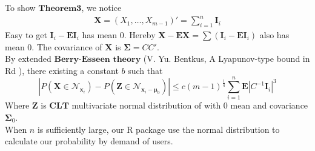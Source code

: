 \documentclass[12pt]{article}
\newcommand{\EE}{\mathbf{E}}
\begin{document}
To show $\mathbf{Theorem 3}$, we notice
\begin{align*}
    \boldsymbol{X} = (X_1,\dots,X_{m-1})' = \sum_{i=1}^{n} \boldsymbol{I}_{i} 
\end{align*}
Easy to get $\boldsymbol{I}_i - \EE \boldsymbol{I}_i$ has mean 0. Hereby $\boldsymbol{X} - \EE \boldsymbol{X} = \sum (\boldsymbol{I}_i - \EE \boldsymbol{I}_i)$ also has mean 0. The covariance of $\boldsymbol{X}$ is $\boldsymbol{\Sigma} = CC'$.\\ 
By extended $\textbf{Berry-Esseen theory}$ (V. Yu. Bentkus, A Lyapunov-type bound in Rd
), there existing  a constant $b$ such that 
\begin{equation*}
    |P\left(\boldsymbol{X} \in \mathcal{N}_{\boldsymbol{x}_i}\right) - P\left(\boldsymbol{Z} \in \mathcal{N}_{\boldsymbol{x}_i-\boldsymbol{\mu}_0} \right)| \leq c(m-1)^{\frac{1}{4}}\sum_{i=1}^{n} \EE \left|C^{-1}\boldsymbol{I}_i\right|^3
\end{equation*}
Where $\boldsymbol{Z}$ is $\textbf{CLT}$ multivariate normal distribution of with 0 mean and covariance $\boldsymbol{\Sigma}_0$.\\ When $n$ is sufficiently large, our R package use the normal distribution to calculate our probability by demand of users.


\end{document}
